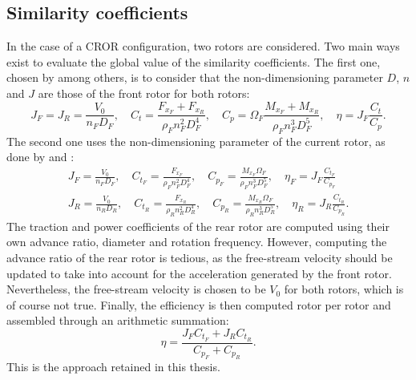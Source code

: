 \subsection{Similarity coefficients}
\label{sub:cror_similarity_coeff}

In the case of a CROR configuration, two rotors are considered.
Two main ways exist to evaluate the global value of the
similarity coefficients. The first one, chosen by
\citet{Bechet2011} among others, is to consider
that the non-dimensioning parameter $D$, $n$ and $J$ are those
of the front rotor for both rotors:
\begin{equation}
    J_F = J_R = \frac{V_0}{n_F D_F}, \quad
    C_t = \frac{F_{x_F} + F_{x_R}}{\rho_F n_F ^ 2  D_F ^ 4}, \quad
    C_p = \Omega_F \frac{M_{x_F} + M_{x_R}}{\rho_F n_F ^ 3 D_F ^ 5}, \quad
    \eta = J_F \frac{C_t}{C_p}.
\end{equation} 
The second one uses the non-dimensioning parameter of the current rotor,
as done by \citet{Stuermer2008} and \citet{Zachariadis2011}:
\begin{equation}
    \begin{split}
        J_F = \frac{V_0}{n_F D_F}, \quad
        C_{t_F} = \frac{F_{x_F}}{\rho_F n_F ^ 2  D_F ^ 4}, \quad
        C_{p_F} = \frac{M_{x_F}\Omega_F}{\rho_F n_F ^ 3 D_F ^ 5}, \quad
        \eta_F = J_F \frac{C_{t_F}}{C_{p_F}} \\
        J_R = \frac{V_0}{n_R D_R}, \quad
        C_{t_R} = \frac{F_{x_R}}{\rho_R n_R ^ 2  D_R ^ 4}, \quad
        C_{p_R} = \frac{M_{x_R}\Omega_F}{\rho_R n_R ^ 3 D_R ^ 5}, \quad
        \eta_R = J_R \frac{C_{t_R}}{C_{p_R}}.
    \end{split}
\end{equation} 
The traction and power coefficients of the rear rotor are
computed using their own advance ratio, diameter and rotation frequency.
However, computing the advance ratio of the rear rotor is tedious, as
the free-stream velocity should be updated to take into account
for the acceleration generated by the front rotor. Nevertheless, the free-stream
velocity is chosen to be $V_0$ for both rotors, which is of course not true.
Finally, the efficiency is then computed rotor per rotor and
assembled through an arithmetic summation:
\begin{equation}
    \eta = \frac{J_F C_{t_F} + J_R C_{t_R}}{C_{p_F} + C_{p_R}}.
\end{equation}
This is the approach retained in this thesis.
